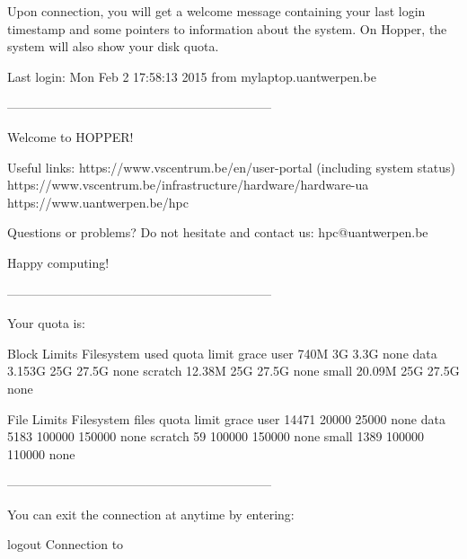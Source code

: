 \ifantwerpen
Upon connection, you will get a welcome message containing your last login
timestamp and some pointers to information about the system. On Hopper, the system
will also show your disk quota.

\begin{prompt}
Last login: Mon Feb  2 17:58:13 2015 from mylaptop.uantwerpen.be

---------------------------------------------------------------

Welcome to HOPPER!

Useful links:
  https://www.vscentrum.be/en/user-portal (including system status)
  https://www.vscentrum.be/infrastructure/hardware/hardware-ua
  https://www.uantwerpen.be/hpc

Questions or problems? Do not hesitate and contact us:
  hpc@uantwerpen.be

Happy computing!

---------------------------------------------------------------

Your quota is:

                   Block Limits
   Filesystem       used      quota      limit    grace
   user             740M         3G       3.3G     none
   data           3.153G        25G      27.5G     none
   scratch        12.38M        25G      27.5G     none
   small          20.09M        25G      27.5G     none

                   File Limits
   Filesystem      files      quota      limit    grace
   user            14471      20000      25000     none
   data             5183     100000     150000     none
   scratch            59     100000     150000     none
   small            1389     100000     110000     none

---------------------------------------------------------------

\end{prompt}
\fi  %

You can exit the connection at anytime by entering:

\begin{prompt}
logout
Connection to %
\end{prompt}

